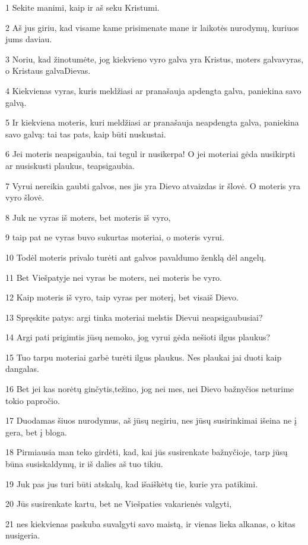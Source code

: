 \par 1 Sekite manimi, kaip ir aš seku Kristumi. 
\par 2 Aš jus giriu, kad visame kame prisimenate mane ir laikotės nurodymų, kuriuos jums daviau. 
\par 3 Noriu, kad žinotumėte, jog kiekvieno vyro galva yra Kristus, moters galva­vyras, o Kristaus galva­Dievas. 
\par 4 Kiekvienas vyras, kuris meldžiasi ar pranašauja apdengta galva, paniekina savo galvą. 
\par 5 Ir kiekviena moteris, kuri meldžiasi ar pranašauja neapdengta galva, paniekina savo galvą: tai tas pats, kaip būti nuskustai. 
\par 6 Jei moteris neapsigaubia, tai tegul ir nusikerpa! O jei moteriai gėda nusikirpti ar nusiskusti plaukus, teapsigaubia. 
\par 7 Vyrui nereikia gaubti galvos, nes jis yra Dievo atvaizdas ir šlovė. O moteris yra vyro šlovė. 
\par 8 Juk ne vyras iš moters, bet moteris iš vyro, 
\par 9 taip pat ne vyras buvo sukurtas moteriai, o moteris vyrui. 
\par 10 Todėl moteris privalo turėti ant galvos pavaldumo ženklą dėl angelų. 
\par 11 Bet Viešpatyje nei vyras be moters, nei moteris be vyro. 
\par 12 Kaip moteris iš vyro, taip vyras per moterį, bet visa­iš Dievo. 
\par 13 Spręskite patys: argi tinka moteriai melstis Dievui neapsigaubusiai? 
\par 14 Argi pati prigimtis jūsų nemoko, jog vyrui gėda nešioti ilgus plaukus? 
\par 15 Tuo tarpu moteriai garbė turėti ilgus plaukus. Nes plaukai jai duoti kaip dangalas. 
\par 16 Bet jei kas norėtų ginčytis,­težino, jog nei mes, nei Dievo bažnyčios neturime tokio papročio. 
\par 17 Duodamas šiuos nurodymus, aš jūsų negiriu, nes jūsų susirinkimai išeina ne į gera, bet į bloga. 
\par 18 Pirmiausia man teko girdėti, kad, kai jūs susirenkate bažnyčioje, tarp jūsų būna susiskaldymų, ir iš dalies aš tuo tikiu. 
\par 19 Juk pas jus turi būti atskalų, kad išaiškėtų tie, kurie yra patikimi. 
\par 20 Jūs susirenkate kartu, bet ne Viešpaties vakarienės valgyti, 
\par 21 nes kiekvienas paskuba suvalgyti savo maistą, ir vienas lieka alkanas, o kitas nusigeria. 
